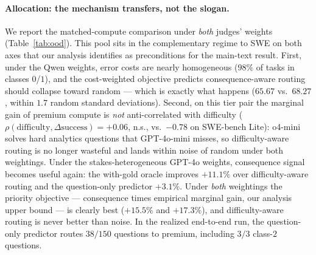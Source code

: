 \documentclass{article}
\begin{document}
\paragraph{Allocation: the mechanism transfers, not the slogan.} We
report the matched-compute comparison under \emph{both} judges'
weights (Table~\ref{tab:ood}). This pool sits in the complementary
regime to SWE on both axes that our analysis identifies as
preconditions for the main-text result. First, under the Qwen
weights, error costs are nearly homogeneous ($98\%$ of tasks in
classes $0$/$1$), and the cost-weighted objective predicts
consequence-aware routing should collapse toward random --- which is
exactly what happens ($65.67$ vs.\ $68.27$, within $1.7$ random
standard deviations). Second, on this tier pair the marginal gain of
premium compute is \emph{not} anti-correlated with difficulty
($\rho(\mathrm{difficulty}, \Delta\mathrm{success}) = +0.06$,
n.s., vs.\ $-0.78$ on SWE-bench Lite): o4-mini solves hard analytics
questions that GPT-4o-mini misses, so difficulty-aware routing is no
longer wasteful and lands within noise of random under both
weightings. Under the stakes-heterogeneous GPT-4o weights,
consequence signal becomes useful again: the with-gold oracle
improves $+11.1\%$ over difficulty-aware routing and the
question-only predictor $+3.1\%$. Under \emph{both} weightings the
priority objective --- consequence times empirical marginal gain,
our analysis upper bound --- is clearly best ($+15.5\%$ and
$+17.3\%$), and difficulty-aware routing is never better than noise.
In the realized end-to-end run, the question-only predictor routes
$38/150$ questions to premium, including $3/3$ class-$2$ questions.
\end{document}
